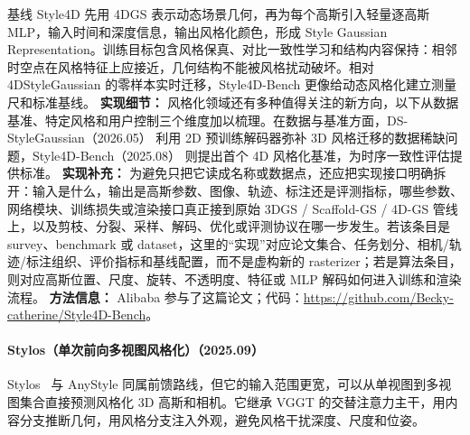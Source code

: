 基线 Style4D 先用 4DGS 表示动态场景几何，再为每个高斯引入轻量逐高斯 MLP，输入时间和深度信息，输出风格化颜色，形成 Style Gaussian Representation。训练目标包含风格保真、对比一致性学习和结构内容保持：相邻时空点在风格特征上应接近，几何结构不能被风格扰动破坏。相对 4DStyleGaussian 的零样本实时迁移，Style4D-Bench 更像给动态风格化建立测量尺和标准基线。
\textbf{实现细节：} 风格化领域还有多种值得关注的新方向，以下从数据基准、特定风格和用户控制三个维度加以梳理。在数据与基准方面，DS-StyleGaussian（2026.05） 利用 2D 预训练解码器弥补 3D 风格迁移的数据稀缺问题，Style4D-Bench（2025.08） 则提出首个 4D 风格化基准，为时序一致性评估提供标准。
\textbf{实现补充：} 为避免只把它读成名称或数据点，还应把实现接口明确拆开：输入是什么，输出是高斯参数、图像、轨迹、标注还是评测指标，哪些参数、网络模块、训练损失或渲染接口真正接到原始 3DGS / Scaffold-GS / 4D-GS 管线上，以及剪枝、分裂、采样、解码、优化或评测协议在哪一步发生。若该条目是survey、benchmark 或 dataset，这里的“实现”对应论文集合、任务划分、相机/轨迹/标注组织、评价指标和基线配置，而不是虚构新的 rasterizer；若是算法条目，则对应高斯位置、尺度、旋转、不透明度、特征或 MLP 解码如何进入训练和渲染流程。
\textbf{方法信息：} Alibaba 参与了这篇论文；代码：\url{https://github.com/Becky-catherine/Style4D-Bench}。



\paragraph{Stylos（单次前向多视图风格化）（2025.09）}
Stylos~\cite{2509_26455} 与 AnyStyle 同属前馈路线，但它的输入范围更宽，可以从单视图到多视图集合直接预测风格化 3D 高斯和相机。它继承 VGGT 的交替注意力主干，用内容分支推断几何，用风格分支注入外观，避免风格干扰深度、尺度和位姿。

